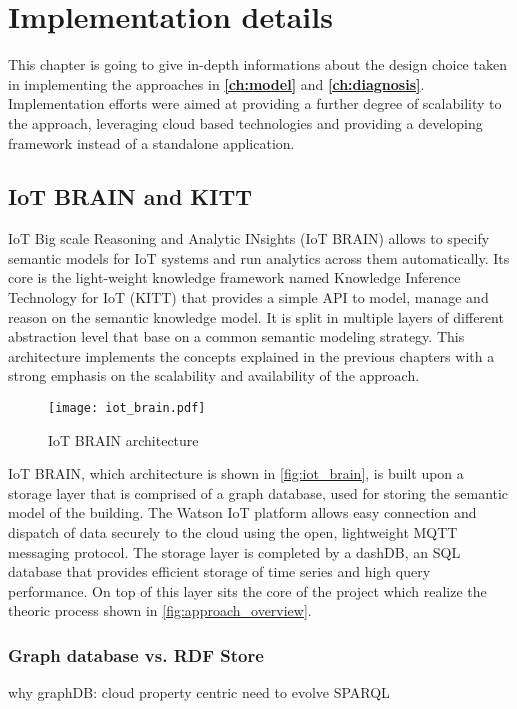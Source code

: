 \chapter{Implementation details}
\onehalfspace
This chapter is going to give in-depth informations about the design choice taken in implementing the approaches in \textbf{\autoref{ch:model}} and \textbf{\autoref{ch:diagnosis}}. Implementation efforts were aimed at providing a further degree of scalability to the approach, leveraging cloud based technologies and providing a developing framework instead of a standalone application.

\section{IoT BRAIN and KITT}
IoT Big scale Reasoning and Analytic INsights (IoT BRAIN) allows to specify semantic models for IoT systems and run analytics across them automatically. Its core is the light-weight knowledge framework named Knowledge Inference Technology for IoT (KITT) that provides a simple API to model, manage and reason on the semantic knowledge model. It is split in multiple layers of different abstraction level that base on a common semantic modeling strategy.
This architecture implements the concepts explained in the previous chapters with a strong emphasis on the scalability and availability of the approach.

\begin{figure}
  \centering
  \texttt{[image: iot\_brain.pdf]}
  \caption{IoT BRAIN architecture}
  \label{fig:iot_brain}
\end{figure}

IoT BRAIN, which architecture is shown in \autoref{fig:iot_brain}, is built upon a storage layer that is comprised of a graph database, used for storing the semantic model of the building. The Watson IoT platform allows easy connection and dispatch of
data securely to the cloud using the open, lightweight MQTT messaging protocol. The storage layer is completed by a dashDB, an SQL database that provides efficient storage of time series and high query performance.
On top of this layer sits the core of the project which realize the theoric process shown in \autoref{fig:approach_overview}.

\subsection{Graph database vs. RDF Store}
why graphDB:
cloud
property centric
need to evolve SPARQL

